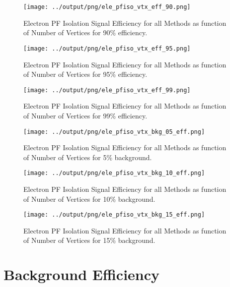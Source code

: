 \documentclass[11pt]{book}
\begin{document}
\begin{figure}[htb]
\centering
\texttt{[image: ../output/png/ele\_pfiso\_vtx\_eff\_90.png]}
\caption{Electron PF Isolation Signal Efficiency for all Methods as function of Number of Vertices for 90\% efficiency.}
\label{fig:ele_pfiso_vtx_eff_90}
\end{figure}

\begin{figure}[htb]
\centering
\texttt{[image: ../output/png/ele\_pfiso\_vtx\_eff\_95.png]}
\caption{Electron PF Isolation Signal Efficiency for all Methods as function of Number of Vertices for 95\% efficiency.}
\label{fig:ele_pfiso_vtx_eff_95}
\end{figure}

\begin{figure}[htb]
\centering
\texttt{[image: ../output/png/ele\_pfiso\_vtx\_eff\_99.png]}
\caption{Electron PF Isolation Signal Efficiency for all Methods as function of Number of Vertices for 99\% efficiency.}
\label{fig:ele_pfiso_vtx_eff_99}
\end{figure}

\begin{figure}[htb]
\centering
\texttt{[image: ../output/png/ele\_pfiso\_vtx\_bkg\_05\_eff.png]}
\caption{Electron PF Isolation Signal Efficiency for all Methods as function of Number of Vertices for 5\% background.}
\label{fig:ele_pfiso_vtx_bkg_05_eff}
\end{figure}

\begin{figure}[htb]
\centering
\texttt{[image: ../output/png/ele\_pfiso\_vtx\_bkg\_10\_eff.png]}
\caption{Electron PF Isolation Signal Efficiency for all Methods as function of Number of Vertices for 10\% background.}
\label{fig:ele_pfiso_vtx_bkg_10_eff}
\end{figure}

\begin{figure}[htb]
\centering
\texttt{[image: ../output/png/ele\_pfiso\_vtx\_bkg\_15\_eff.png]}
\caption{Electron PF Isolation Signal Efficiency for all Methods as function of Number of Vertices for 15\% background.}
\label{fig:ele_pfiso_vtx_bkg_15_eff}
\end{figure}
\clearpage

\chapter{Background Efficiency}
\end{document}
